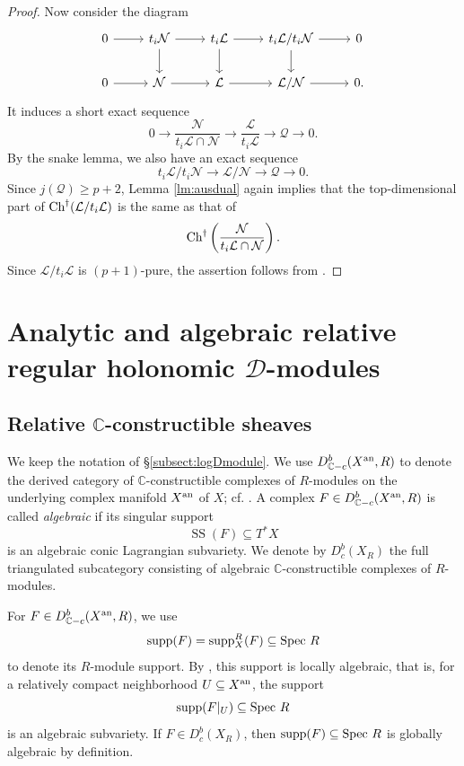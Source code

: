 \documentclass{amsart}
\theoremstyle{plain}
\numberwithin{theorem}{section}
\theoremstyle{definition}
\theoremstyle{remark}
\theoremstyle{definition}
\newcommand{\C}{\mathbb{C}} %
\newcommand{\cL}{\mathcal{L}}
\newcommand{\cN}{\mathcal{N}}
\newcommand{\cQ}{\mathcal{Q}}
\newcommand{\shD}{\mathscr{D}}
\newcommand{\Spec}{\textup{Spec }}
\newcommand{\an}{\textup{an}}
\newcommand{\supp}{\textup{supp}}
\newcommand{\Ch}{\textup{Ch}}
\begin{document}
\begin{proof}
Now consider the diagram
\[
\begin{tikzcd}
0\arrow[r] &
t_i\cN\arrow[r]\arrow[d] &
t_i\cL \arrow[r]\arrow[d] &
t_i\cL/t_i\cN\arrow[r]\arrow[d] &
0\\
0\arrow[r] &
\cN\arrow[r] &
\cL \arrow[r] &
\cL/\cN\arrow[r] &
0 .
\end{tikzcd}
\]
It induces a short exact sequence
\[
0
\to
\frac{\cN}{t_i\cL\cap\cN}
\longrightarrow
\frac{\cL}{t_i\cL}
\longrightarrow
\cQ
\to
0.
\]
By the snake lemma, we also have an exact sequence
\[
t_i\cL/t_i\cN
\longrightarrow
\cL/\cN
\longrightarrow
\cQ
\to
0.
\]
Since $j(\cQ)\ge p+2$, Lemma \ref{lm:ausdual} again implies that the
top-dimensional part of $\Ch^\dagger(\cL/t_i\cL)$ is the same as that of
\[
\Ch^\dagger\left(\frac{\cN}{t_i\cL\cap\cN}\right).
\]
Since $\cL/t_i\cL$ is $(p+1)$-pure, the assertion follows from
\cite[A.IV 4.11 and 3.7]{BJ}.
\end{proof}


\section{Analytic and algebraic relative regular holonomic $\shD$-modules}
\label{sect:GAGArel}

\subsection{Relative $\C$-constructible sheaves}
\label{subsect:relconstrsh}

We keep the notation of \S \ref{subsect:logDmodule}. We use
$D^b_{\C-c}(X^\an,R)$ to denote the derived category of
$\C$-constructible complexes of $R$-modules on the underlying complex
manifold $X^\an$ of $X$; cf. \cite[Def.8.5.6]{KSbook}. A complex
$F\in D^b_{\C-c}(X^\an,R)$ is called \emph{algebraic} if its singular
support
\[
\operatorname{SS}(F)\subseteq T^*X
\]
is an algebraic conic Lagrangian subvariety. We denote by $D^b_c(X_R)$ the
full triangulated subcategory consisting of algebraic $\C$-constructible
complexes of $R$-modules.

For $F\in D^b_{\C-c}(X^\an,R)$, we use
\[
\supp(F)=\supp_X^R(F)\subseteq \Spec R
\]
to denote its $R$-module support. By
\cite[Thm.8.5.5]{KSbook}, this support is locally algebraic, that is, for a relatively compact
neighborhood $U\subseteq X^\an$, the support
\[
\supp(F|_U)\subseteq \Spec R
\]
is an algebraic subvariety. If $F\in D^b_c(X_R)$, then
$\supp(F)\subseteq \Spec R$ is globally algebraic by definition.
\end{document}
